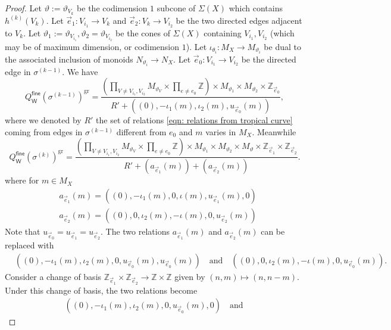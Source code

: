 \documentclass[10pt,a4paper]{amsart}
\newcommand{\W}{\mathsf{W}}
\newcommand{\fine}{\mathsf{fine}}
\newcommand{\gr}{\mathrm{gr}}
\begin{document}
\begin{proof}
    Let $\vartheta:=\vartheta_{V_k}$ be the codimension $1$ subcone of $\Sigma(X)$ which contains $h^{(k)}(V_k)$. Let  $\vec{e}_1 \colon V_{i_1} \rightarrow V_k$ and $\vec{e}_2 \colon V_k \rightarrow V_{i_2}$ be the two directed edges adjacent to $V_k$. Let $\vartheta_1:= \vartheta_{V_{i_1}}, \vartheta_2=\vartheta_{V_{i_2}} $ be the cones of $\Sigma(X)$ containing $V_{i_1}, V_{i_2}$ (which may be of maximum dimension, or codimension $1$). Let $\iota_{\theta_i} :  M_X  \rightarrow M_{\vartheta_i}$ be dual to the associated inclusion of monoids $N_{\vartheta_i} \rightarrow N_X$. Let $\vec{e}_0 \colon V_{i_1} \rightarrow V_{i_2}$ be the directed edge in $\sigma^{(k-1)}$. We have 
    $$Q_{\W}^{\fine}(\sigma^{(k-1)})^{\gr} = \frac{(\prod_{V \neq V_{i_1}, V_{i_2}} M_{\vartheta_V} \times \prod_{e \neq e_0} \mathbb{Z}) \times M_{\vartheta_1} \times M_{\vartheta_2} \times  \mathbb{Z}_{\vec{e}_0}}{R' + ((0), -\iota_1(m), \iota_2(m), u_{\vec{e}_0}(m))},$$
    where we denoted by $R'$ the set of relations \eqref{eqn: relations from tropical curve} coming from edges in $\sigma^{(k-1)}$ different from $e_0$ and $m$ varies in $M_X$. Meanwhile  
    $$Q_{\W}^{\fine}(\sigma^{(k)})^{\gr} = \frac{(\prod_{V \neq V_{i_1}, V_{i_2}} M_{\vartheta_V} \times \prod_{e \neq e_0} \mathbb{Z}) \times M_{\vartheta_1} \times M_{\vartheta_2}  \times M_{\vartheta} \times \mathbb{Z}_{\vec{e}_1} \times \mathbb{Z}_{\vec{e}_2} }{R' + (a_{\vec{e}_1}(m)) + (a_{\vec{e}_2}(m))}.$$
    where for $m \in M_X$
    \begin{align*}
        &a_{\vec{e}_1}(m) = ((0), -\iota_1(m), 0 , \iota(m),  u_{\vec{e}_1}(m), 0)\\
        &a_{\vec{e}_2}(m) = ((0), 0, \iota_2(m) , -\iota(m), 0, u_{\vec{e}_2}(m))
    \end{align*}
    Note that $u_{\vec{e}_0} = u_{\vec{e}_1} = u_{\vec{e}_2}$. The two relations $a_{\vec{e}_1}(m)$ and $a_{\vec{e}_2}(m)$ can be replaced with 
    \begin{align*}
        &((0), -\iota_1(m), \iota_2(m),  0,  u_{\vec{e}_0}(m), u_{\vec{e}_0}(m))  \quad \text{and} \quad
        ((0), 0, \iota_2(m) , -\iota(m), 0, u_{\vec{e}_0}(m)). 
    \end{align*}
    Consider a change of basis $\mathbb{Z}_{\vec{e}_1} \times \mathbb{Z}_{\vec{e}_2} \rightarrow \mathbb{Z} \times \mathbb{Z}$ given by $(n,m) \mapsto (n, n-m)$. Under this change of basis, the two relations become 
    \begin{align*}
            &((0), -\iota_1(m), \iota_2(m),  0,  u_{\vec{e}_0}(m), 0)  \quad \text{and} \quad

\end{align*}
\end{proof}
\end{document}
